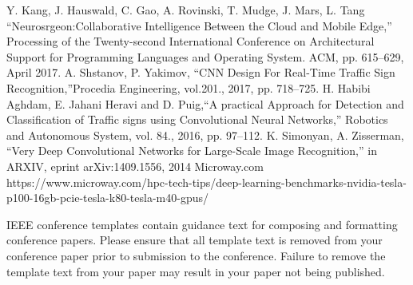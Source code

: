 \documentclass[conference]{IEEEtran}
\begin{document}
\begin{thebibliography}{00}
 Y. Kang, J. Hauswald, C. Gao, A. Rovinski, T. Mudge, J. Mars, L. Tang ``Neurosrgeon:Collaborative Intelligence Between the Cloud and Mobile Edge,'' Processing of the Twenty-second International Conference on Architectural Support for Programming Languages and Operating System. ACM, pp. 615--629, April 2017.
 A. Shstanov, P. Yakimov, ``CNN Design For Real-Time Traffic Sign Recognition,''Procedia Engineering, vol.201., 2017, pp. 718--725.
 H. Habibi Aghdam, E. Jahani Heravi and D. Puig,``A practical Approach for Detection and Classification of Traffic signs using Convolutional Neural Networks,'' Robotics and Autonomous System, vol. 84., 2016, pp. 97--112.
 K. Simonyan, A. Zisserman, ``Very Deep Convolutional Networks for Large-Scale Image Recognition,'' in ARXIV, eprint arXiv:1409.1556, 2014
 Microway.com https://www.microway.com/hpc-tech-tips/deep-learning-benchmarks-nvidia-tesla-p100-16gb-pcie-tesla-k80-tesla-m40-gpus/
\end{thebibliography}
\vspace{12pt}
\color{red}
IEEE conference templates contain guidance text for composing and formatting conference papers. Please ensure that all template text is removed from your conference paper prior to submission to the conference. Failure to remove the template text from your paper may result in your paper not being published.
\end{document}
